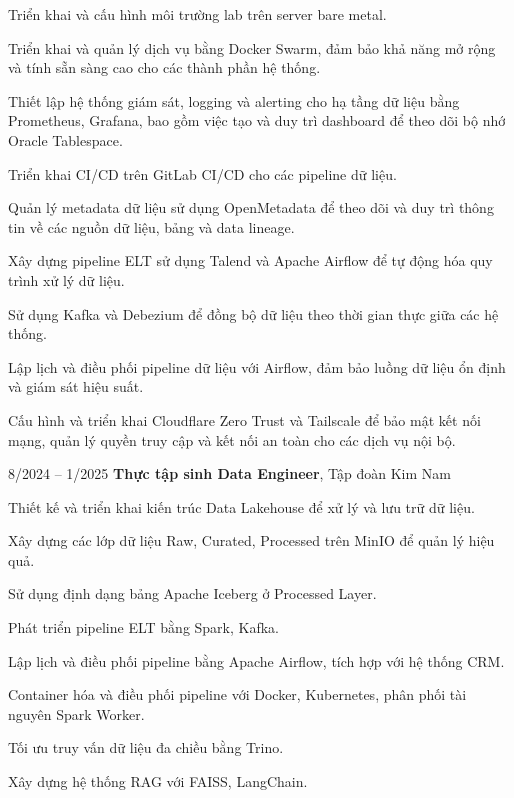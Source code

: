 \begin{onecolentry}
    \begin{highlights}
        \item Triển khai và cấu hình môi trường lab trên server bare metal.
        \item Triển khai và quản lý dịch vụ bằng Docker Swarm, đảm bảo khả năng mở rộng và tính sẵn sàng cao cho các thành phần hệ thống.
        \item Thiết lập hệ thống giám sát, logging và alerting cho hạ tầng dữ liệu bằng Prometheus, Grafana, bao gồm việc tạo và duy trì dashboard để theo dõi bộ nhớ Oracle Tablespace.
        \item Triển khai CI/CD trên GitLab CI/CD cho các pipeline dữ liệu.
        \item Quản lý metadata dữ liệu sử dụng OpenMetadata để theo dõi và duy trì thông tin về các nguồn dữ liệu, bảng và data lineage.
        \item Xây dựng pipeline ELT sử dụng Talend và Apache Airflow để tự động hóa quy trình xử lý dữ liệu.
        \item Sử dụng Kafka và Debezium để đồng bộ dữ liệu theo thời gian thực giữa các hệ thống.
        \item Lập lịch và điều phối pipeline dữ liệu với Airflow, đảm bảo luồng dữ liệu ổn định và giám sát hiệu suất.
        \item Cấu hình và triển khai Cloudflare Zero Trust và Tailscale để bảo mật kết nối mạng, quản lý quyền truy cập và kết nối an toàn cho các dịch vụ nội bộ.
    \end{highlights}
\end{onecolentry}
\vspace{0.2 cm}

\begin{twocolentry}{8/2024 – 1/2025}
    \textbf{Thực tập sinh Data Engineer}, Tập đoàn Kim Nam
\end{twocolentry}

\vspace{0.10 cm}
\begin{onecolentry}
    \begin{highlights}
        \item Thiết kế và triển khai kiến trúc Data Lakehouse để xử lý và lưu trữ dữ liệu.
        \item Xây dựng các lớp dữ liệu Raw, Curated, Processed trên MinIO để quản lý hiệu quả.
        \item Sử dụng định dạng bảng Apache Iceberg ở Processed Layer.
        \item Phát triển pipeline ELT bằng Spark, Kafka.
        \item Lập lịch và điều phối pipeline bằng Apache Airflow, tích hợp với hệ thống CRM.
        \item Container hóa và điều phối pipeline với Docker, Kubernetes, phân phối tài nguyên Spark Worker.
        \item Tối ưu truy vấn dữ liệu đa chiều bằng Trino.
        \item Xây dựng hệ thống RAG với FAISS, LangChain.
    \end{highlights}
\end{onecolentry}



